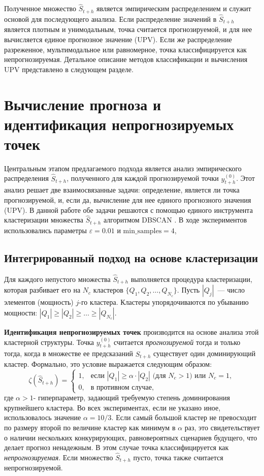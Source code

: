 Полученное множество $\hat{S}_{t+h}$ является эмпирическим распределением и служит
 основой для последующего анализа. Если распределение значений в $\hat{S}_{t+h}$
  является плотным и унимодальным, точка считается прогнозируемой, и для нее
  вычисляется единое прогнозное значение (UPV). Если же распределение разреженное,
   мультимодальное или равномерное, точка классифицируется как непрогнозируемая.
    Детальное описание методов классификации и вычисления UPV представлено в следующем разделе.

\section{Вычисление прогноза и идентификация непрогнозируемых точек}

Центральным этапом предлагаемого подхода является анализ эмпирического распределения
 $\hat{S}_{t+h}$, полученного для каждой прогнозируемой точки $y_{t+h}^{(0)}$. Этот
  анализ решает две взаимосвязанные задачи: определение, является ли точка прогнозируемой,
   и, если да, вычисление для нее единого прогнозного значения (UPV). В данной работе обе
   задачи
   решаются с помощью единого инструмента~ кластеризации множества $\hat{S}_{t+h}$ алгоритмом DBSCAN \cite{Aggarwal2013}. 
   В ходе экспериментов использовались параметры $\varepsilon=0.01$ и $\text{min\_samples}=4$,
\subsection{Интегрированный подход на основе кластеризации}

Для каждого непустого множества $\hat{S}_{t+h}$ выполняется процедура кластеризации,
 которая разбивает его на $N_c$ кластеров $\{Q_1, Q_2, \dots, Q_{N_c}\}$. Пусть $|Q_j|$~--- число
  элементов (мощность) $j$-го кластера. Кластеры упорядочиваются по убыванию мощности:
   $|Q_1| \ge |Q_2| \ge \dots \ge |Q_{N_c}|$.

\textbf{Идентификация непрогнозируемых точек} производится на основе анализа этой
кластерной структуры. Точка $y_{t+h}^{(0)}$ считается \textit{прогнозируемой} тогда
 и только тогда, когда в множестве ее предсказаний $\hat{S}_{t+h}$ существует один
 доминирующий кластер. Формально, это условие выражается следующим образом:
\[
\zeta(\hat{S}_{t+h}) =
\begin{cases}
1, & \text{если } |Q_1| \ge \alpha \cdot |Q_2| \text{ (для } N_c > 1\text{) или } N_c = 1, \\
0, & \text{в противном случае,}
\end{cases}
\]
где $\alpha > 1$- гиперпараметр, задающий требуемую степень доминирования крупнейшего кластера.
 Во всех экспериментах, если не указано иное, использовалось значение $\alpha = 10/3$. Если самый большой кластер не превосходит по размеру
 второй по величине кластер как минимум в $\alpha$ раз, это свидетельствует о
 наличии нескольких конкурирующих, равновероятных сценариев будущего, что делает
  прогноз ненадежным. В этом случае точка классифицируется как \textit{непрогнозируемая}.
   Если множество $\hat{S}_{t+h}$ пусто, точка также считается непрогнозируемой.

